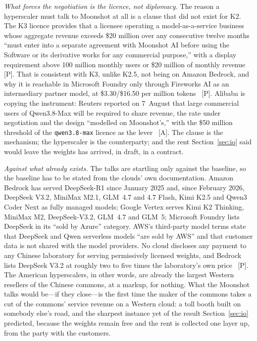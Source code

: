 \emph{What forces the negotiation is the licence, not diplomacy.} The reason a hyperscaler must talk to Moonshot at all is a clause that did not exist for K2. The K3 licence provides that a licensee operating a model-as-a-service business whose aggregate revenue exceeds \$20 million over any consecutive twelve months ``must enter into a separate agreement with Moonshot AI before using the Software or its derivative works for any commercial purpose,'' with a display requirement above 100 million monthly users or \$20 million of monthly revenue~\cite{kimi-k3-license-maas} [P]. That is consistent with K3, unlike K2.5, not being on Amazon Bedrock, and why it is reachable in Microsoft Foundry only through Fireworks AI as an intermediary partner model, at \$3.30/\$16.50 per million tokens~\cite{us-clouds-chinese-weights,kimi-k3-license-maas} [P]. Alibaba is copying the instrument: Reuters reported on 7~August that large commercial users of Qwen3.8-Max will be required to share revenue, the rate under negotiation and the design ``modelled on Moonshot's,'' with the \$50 million threshold of the \texttt{qwen3.8-max} licence as the lever~\cite{qwen-revshare} [A]. The clause is the mechanism; the hyperscaler is the counterparty; and the rent Section~\ref{sec:io} said would leave the weights has arrived, in draft, in a contract.

\emph{Against what already exists.} The talks are startling only against the baseline, so the baseline has to be stated from the clouds' own documentation. Amazon Bedrock has served DeepSeek-R1 since January 2025 and, since February 2026, DeepSeek V3.2, MiniMax M2.1, GLM~4.7 and 4.7 Flash, Kimi K2.5 and Qwen3 Coder Next as fully managed models; Google Vertex serves Kimi K2 Thinking, MiniMax M2, DeepSeek-V3.2, GLM~4.7 and GLM~5; Microsoft Foundry lists DeepSeek in its ``sold by Azure'' category. AWS's third-party model terms state that DeepSeek and Qwen serverless models ``are sold by AWS'' and that customer data is not shared with the model providers. No cloud discloses any payment to any Chinese laboratory for serving permissively licensed weights, and Bedrock lists DeepSeek V3.2 at roughly two to five times the laboratory's own price~\cite{us-clouds-chinese-weights} [P]. The American hyperscalers, in other words, are already the largest Western resellers of the Chinese commons, at a markup, for nothing. What the Moonshot talks would be---if they close---is the first time the maker of the commons takes a cut of the commons' service revenue on a Western cloud: a toll booth built on somebody else's road, and the sharpest instance yet of the result Section~\ref{sec:io} predicted, because the weights remain free and the rent is collected one layer up, from the party with the customers.

